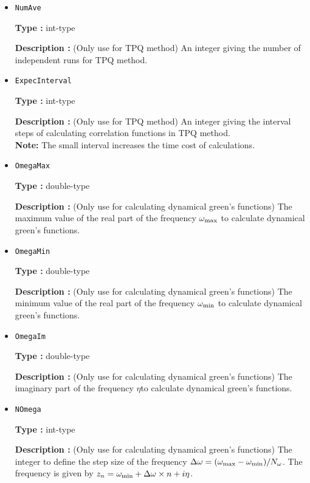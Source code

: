 \begin{itemize}
\item \verb|NumAve|

{\bf Type :} int-type

{\bf Description :} (Only use for TPQ method) An integer giving the number of independent runs for TPQ method. 

\item \verb|ExpecInterval|

{\bf Type :} int-type

{\bf Description :} (Only use for TPQ method) An integer giving the interval steps of calculating correlation functions in TPQ method.\\ 
{\bf Note:} The small interval increases the time cost of calculations.
 
 \item \verb|OmegaMax|

{\bf Type :} double-type

{\bf Description :} {(Only use for calculating dynamical green's functions) The maximum value of the real part of the frequency $\omega_{\rm max}$ to calculate dynamical green's functions.}

\item \verb|OmegaMin|

{\bf Type :} double-type

{\bf Description :} {(Only use for calculating dynamical green's functions) The minimum value of the real part of the frequency $\omega_{\rm min}$ to calculate dynamical green's functions.}

\item \verb|OmegaIm|

{\bf Type :} double-type

{\bf Description :} {(Only use for calculating dynamical green's functions) The imaginary part of the frequency $\eta$to calculate dynamical green's functions.}
 
\item \verb|NOmega|

{\bf Type :} int-type

{\bf Description :} {(Only use for calculating dynamical green's functions) The integer to define the step size of the frequency $\Delta \omega = (\omega_{\rm max}-\omega_{\rm min} )/N_{\omega}$. The frequency is given by $z_n=\omega_{\rm min} + \Delta \omega \times n+ i\eta$.} 
 
 \end{itemize}


\newpage
